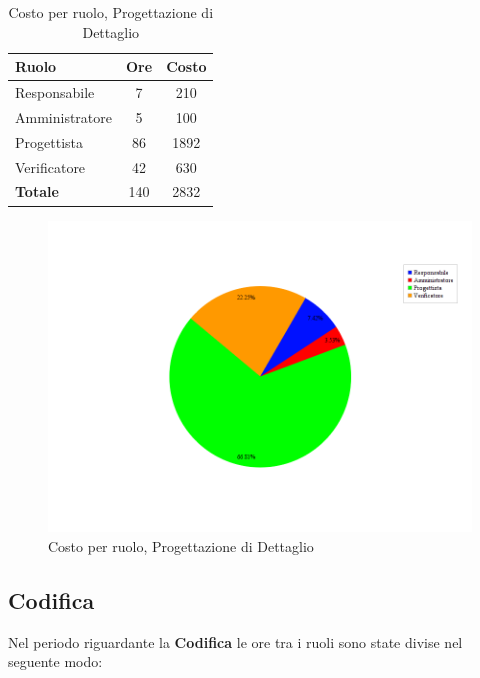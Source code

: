 \begin{table}[H]
	\begin{center}
		\begin{tabular}{|l|c|c|}
			\hline
			\textbf{Ruolo}	& \textbf{Ore} &	\textbf{Costo}	 \\
			\hline
			Responsabile	&	7	&	210		\\
			\hline
			Amministratore	&	5	&	100		\\
			\hline
			Progettista		&	86	&	1892	\\
			\hline
			Verificatore	&	42	&	630		\\
			\hline
			\textbf{Totale}	&	140	&	2832	\\
			\hline
		\end{tabular}
	\end{center}
	\caption{Costo per ruolo, Progettazione di Dettaglio}
\end{table}

\begin{figure}[H]
	\centering
	\includegraphics[scale=0.4]{immagini/Grafi/CostoPD}
	\caption{Costo per ruolo, Progettazione di Dettaglio}
\end{figure}


\subsection{Codifica}
Nel periodo riguardante la \textbf{Codifica} le ore tra i ruoli sono state divise nel seguente modo:

